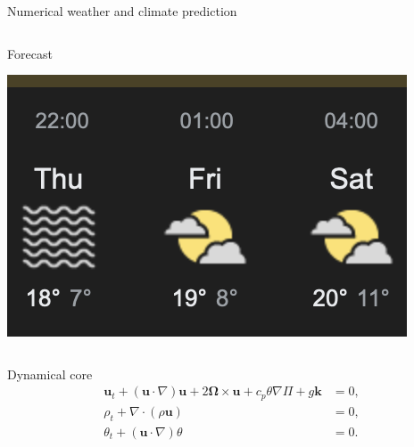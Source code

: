 \documentclass{beamer}
\def\MM#1{\boldsymbol{#1}}
\begin{document}
\begin{frame}{Numerical weather and climate prediction}
\begin{columns}[T]
\begin{column}{0.33\textwidth}
      \centerline{Forecast}
      \vspace{0.2cm}
      \centerline{\includegraphics[width=\columnwidth]{figures/mini_forecast2.png}}
    \end{column}
  \end{columns}
  \vspace{1cm}
  \begin{block}{Dynamical core}
  \vspace{-0.5cm}
    \begin{align*}
      \MM{u}_t + (\MM{u}\cdot\nabla)\MM{u} + 2\MM{\Omega}\times\MM{u} + c_p\theta\nabla\Pi + g\MM{k} &= 0, \\
      \rho_t + \nabla\cdot(\rho\MM{u}) &= 0, \\
      \theta_t + (\MM{u}\cdot\nabla)\theta &= 0.
    \end{align*}
  \end{block}
\end{frame}
\end{document}
